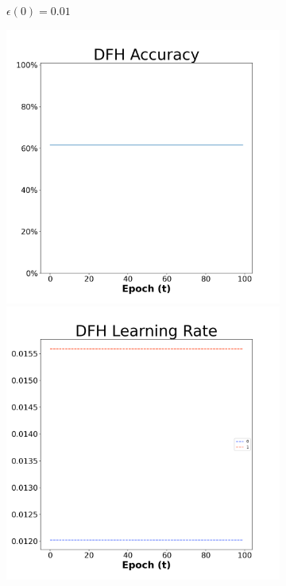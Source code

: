 \begin{figure}[H]
\begin{subfigure}{0.3\textwidth}
  \caption{$\epsilon(0)=0.01$}
\end{subfigure}\hfil %
\begin{subfigure}{0.3\textwidth}
  \includegraphics[width=\linewidth]{images/exper1/SP/DFH_0.03_acc.png}
  \includegraphics[width=\linewidth]{images/exper1/SP/DFH_0.03_lr.png}

\end{subfigure}
\end{figure}
